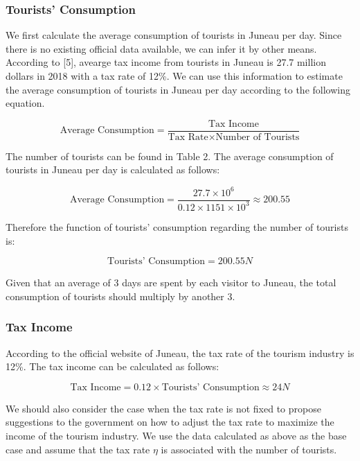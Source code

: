 \subsubsection{Tourists' Consumption}

We first calculate the average consumption of tourists in Juneau per day. Since there is no existing official data available, 
we can infer it by other means. According to [5], avearge tax income from tourists in Juneau is 27.7 million dollars in 2018
with a tax rate of 12\%. We can use this information to estimate the average consumption of tourists in Juneau per day according to 
the following equation.

\begin{equation}
    \text{Average Consumption} = \frac{\text{Tax Income}}{\text{Tax Rate} \times \text{Number of Tourists}}
\end{equation}

The number of tourists can be found in Table 2. The average consumption of 
tourists in Juneau per day is calculated as follows:

\begin{equation}
    \text{Average Consumption} = \frac{27.7 \times 10^6}{0.12 \times 1151 \times 10^3} \approx 200.55
\end{equation}

Therefore the function of tourists' consumption regarding the number of tourists is:


\begin{equation}
    \text{Tourists' Consumption} = 200.55 N
\end{equation}

Given that an average of 3 days are spent by each visitor to Juneau, 
the total consumption of tourists should multiply by another 3.

\subsubsection{Tax Income}

According to the official website of Juneau, the tax rate of the tourism industry is 12\%.
The tax income can be calculated as follows:

\begin{equation}
    \text{Tax Income} = 0.12 \times \text{Tourists' Consumption} \approx 24 N
\end{equation}

We should also consider the case when the tax rate is not fixed to propose suggestions to the
government on how to adjust the tax rate to maximize the income of the tourism industry. We
use the data calculated as above as the base case and assume that the tax rate $\eta$ is associated with the number of tourists.

